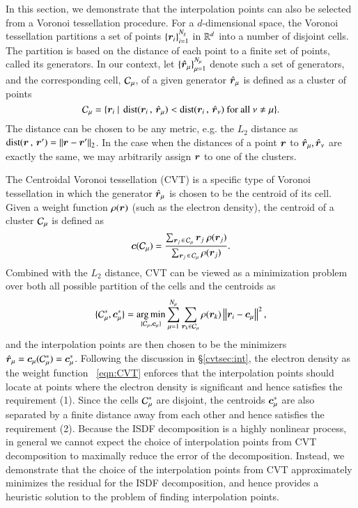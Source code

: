 In this section, we demonstrate that the interpolation points can also be
selected from a Voronoi tessellation procedure. For a $d$-dimensional space, the
Voronoi tessellation partitions a set of points $\{\bm{r}_{i}\}_{i=1}^{N_{g}}$ in
$\mathbb{R}^{d}$ into a number of disjoint cells. The partition is based on the
distance of each point to a finite set of points, called its generators. In our
context, let $\{\smash{\hat{\bm{r}}}_\mu\}_{\mu=1}^{N_{\mu}}$ denote such a set of generators,
and the corresponding cell, $\mathcal{C}_\mu$, of a given generator $\smash{\hat{\bm{r}}}_\mu$ is
defined as a cluster of points
\begin{equation}\label{eqn:vcell}
  \mathcal{C}_\mu = \{\bm{r}_{i} ~\vert~\operatorname{dist}(\bm{r}_{i}\,,\, \smash{\hat{\bm{r}}}_\mu) <
  \operatorname{dist}(\bm{r}_{i}\, ,\, \smash{\hat{\bm{r}}}_\nu) \textrm{ for all } \nu \neq \mu\}.
\end{equation}
The distance can be chosen to be any metric, e.g. the $L_2$ distance as $\operatorname{dist}
(\bm{r}\,,\,\bm{r}')=\left\lVert\bm{r}-\bm{r}'\right\rVert_2$. In the case when the distances of a point
$\bm{r}$ to $\smash{\hat{\bm{r}}}_\mu, \smash{\hat{\bm{r}}}_\nu$ are exactly the same, we may arbitrarily
assign $\bm{r}$ to one of the clusters.

The Centroidal Voronoi tessellation (CVT) is a specific type of Voronoi
tessellation in which the generator $\smash{\hat{\bm{r}}}_\mu$ is chosen to be the centroid of
its cell. Given a weight function $\rho(\bm{r})$ (such as the electron density),
the centroid of a cluster $\mathcal{C}_\mu$ is defined as
\begin{equation}\label{eqn:centcomp}
  \bm{c}(\mathcal{C}_\mu) = \frac{\sum_{\bm{r}_{j}\operatorname{\in} \mathcal{C}_\mu} \bm{r}_j\;\rho
  (\bm{r}_j)}{\sum_{\bm{r}_j\operatorname{\in} \mathcal{C}_\mu}\rho(\bm{r}_j)}.
\end{equation}
Combined with the $L_2$ distance, CVT can be viewed as a minimization problem
over both all possible partition of the cells and the centroids as \cite{MacQueen1967}
\begin{equation}\label{eqn:CVT}
  \{\mathcal{C}_\mu^\ast,\bm{c}_{\mu}^{*}\} = \operatorname*{arg\,min}_{\{\mathcal{C}_\mu, \bm{c}_{\mu}\}} \sum_
  {\mu=1}^{N_{\mu}} \sum_{\bm{r}_k\in \mathcal{C}_\mu}\rho(\bm{r}_k)\left\lVert\bm{r}_i-\bm{c}_{\mu}\right\rVert^2,
\end{equation}
and the interpolation points are then chosen to be the minimizers
$\smash{\hat{\bm{r}}}_\mu=\bm{c}_{\mu}(\mathcal{C}_\mu^\ast)=\bm{c}_{\mu}^{\ast}$. Following the
discussion in \S \ref{cvtsec:int}, the electron density as the weight function~
\eqref{eqn:CVT} enforces that the interpolation points should locate at points
where the electron density is significant and hence satisfies the requirement 
(1). Since the cells $\mathcal{C}_\mu^\ast$ are disjoint, the centroids $\bm{c}_{\mu}^
\ast$ are also separated by a finite distance away from each other and hence
satisfies the requirement (2). Because the ISDF decomposition is a highly
nonlinear process, in general we cannot expect the choice of interpolation
points from CVT decomposition to maximally reduce the error of the
decomposition. Instead, we demonstrate that the choice of the interpolation
points from CVT approximately minimizes the residual for the ISDF decomposition,
and hence provides a heuristic solution to the problem of finding interpolation
points.

